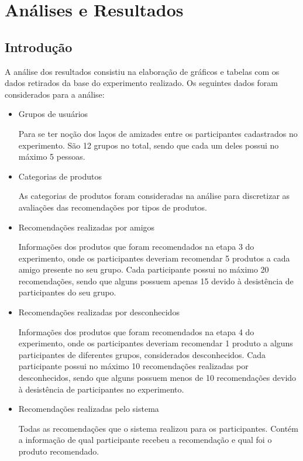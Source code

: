 \chapter{Análises e Resultados} %
\label{cha:analise}

\section{Introdução}
\label{cha:introducao}

 A análise dos resultados consistiu na elaboração de gráficos e tabelas com os dados retirados da base do experimento realizado. Os seguintes dados foram considerados para a análise:
 
\begin{itemize}
	\item Grupos de usuários
	
	Para se ter noção dos laços de amizades entre os participantes cadastrados no experimento. São 12 grupos no total, sendo que cada um deles possui no máximo 5 pessoas.
	
	\item Categorias de produtos
	
	As categorias de produtos foram consideradas na análise para discretizar as avaliações das recomendações por tipos de produtos.
	
	\item Recomendações realizadas por amigos
	
	Informações dos produtos que foram recomendados na etapa 3 do experimento, onde os participantes deveriam recomendar 5 produtos a cada amigo presente no seu grupo. Cada participante possui no máximo 20 recomendações, sendo que alguns possuem apenas 15 devido à desistência de participantes do seu grupo.
	
	\item Recomendações realizadas por desconhecidos
	
	Informações dos produtos que foram recomendados na etapa 4 do experimento, onde os participantes deveriam recomendar 1 produto a alguns participantes de diferentes grupos, considerados desconhecidos. Cada participante possui no máximo 10 recomendações realizadas por desconhecidos, sendo que alguns possuem menos de 10 recomendações devido à desistência de participantes no experimento.
	
	\item Recomendações realizadas pelo sistema
	
	Todas as recomendações que o sistema realizou para os participantes. Contém a informação de qual participante recebeu a recomendação e qual foi o produto recomendado.
	

\end{itemize}
